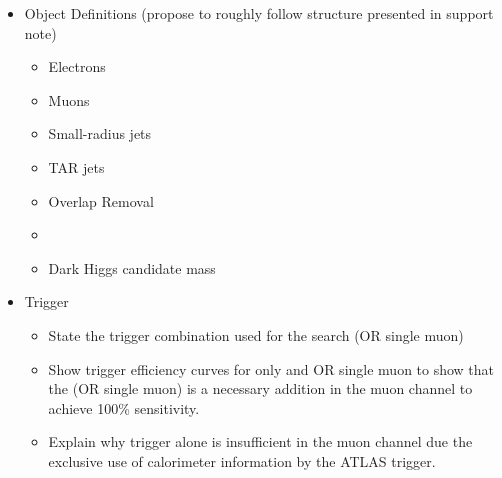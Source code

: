 \label{chapter:objects}

\begin{itemize}
\item Object Definitions (propose to roughly follow structure presented in support note)
\begin{itemize}
\item Electrons
\item Muons
\item Small-radius \aktfour jets
\item TAR jets
\item Overlap Removal
\item \met
\item Dark Higgs candidate mass \ms
\end{itemize}

\item Trigger
\begin{itemize}
\item State the trigger combination used for the search (\met OR single muon)
\item Show trigger efficiency curves for \met only and \met OR single muon to show that the (OR single muon) is a necessary addition in the muon channel to achieve 100\% sensitivity.
\item Explain why \met trigger alone is insufficient in the muon channel due the exclusive use of calorimeter information by the ATLAS \met trigger.
\end{itemize}


\end{itemize}
